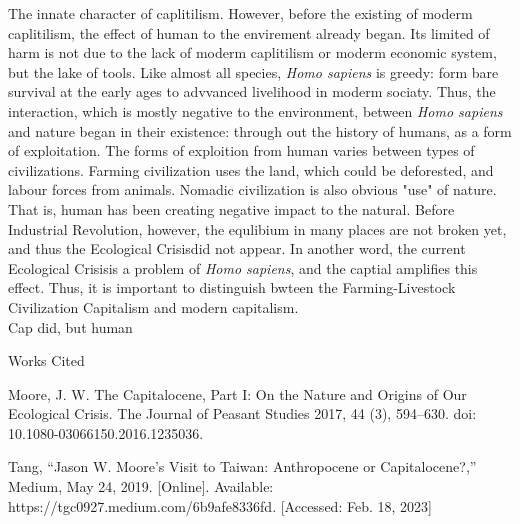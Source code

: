 \documentclass[12pt]{article}
\newcommand{\IR}{Industrial Revolution}
\newcommand{\EC}{Ecological Crisis}
\newcommand{\bibent}{\noindent \hangindent 40pt}
\newenvironment{workscited}{\newpage \begin{center} Works Cited \end{center}}{\newpage }
\begin{document}
\begin{flushleft}
The innate character of caplitilism.
However, before the existing of moderm caplitilism, the effect of human to the envirement already began. Its limited of harm is not due to the lack of moderm caplitilism or moderm economic system, but the lake of tools. Like almost all species, \textit{Homo sapiens} is greedy: form bare survival at the early ages to advvanced livelihood in moderm sociaty. Thus, the interaction, which is mostly negative to the environment, between \textit{Homo sapiens} and nature began in their existence: through out the history of humans, as a form of exploitation. The forms of exploition from human varies between types of civilizations. Farming civilization uses the land, which could be deforested, and labour forces from animals. Nomadic civilization is also obvious "use" of nature. That is, human has been creating negative impact to the natural. Before \IR, however, the equlibium in many places are not broken yet, and thus the \EC did not appear. In another word, the current \EC is a problem of \textit{Homo sapiens}, and the captial amplifies this effect. Thus, it is important to distinguish bwteen the Farming-Livestock Civilization Capitalism and modern capitalism.
\\

Cap did, but human
\newpage



\begin{workscited}

\bibent Moore, J. W. The Capitalocene, Part I: On the Nature and Origins of Our Ecological Crisis. The Journal of Peasant Studies 2017, 44 (3), 594–630. doi: 10.1080-03066150.2016.1235036.

\bibent 
 Tang, “Jason W. Moore's Visit to Taiwan: Anthropocene or Capitalocene?,” Medium, May 24, 2019.  [Online]. Available: https://tgc0927.medium.com/6b9afe8336fd. [Accessed: Feb. 18, 2023]



\end{workscited}

\end{flushleft}
\end{document}
